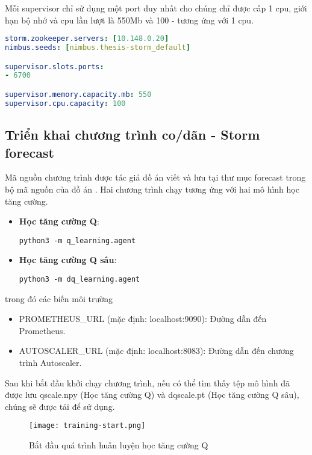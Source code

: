 Mỗi supervisor chỉ sử dụng một port duy nhất cho chúng chỉ được cấp 1 \gls{cpu}, giới hạn bộ nhớ và \gls{cpu} lần lượt là 550Mb và 100 - tương ứng với 1 \gls{cpu}.
\begin{lstlisting}[language=yaml, caption={Cấu hình của dịch vụ supervisor}]
storm.zookeeper.servers: [10.148.0.20]
nimbus.seeds: [nimbus.thesis-storm_default]

supervisor.slots.ports:
- 6700

supervisor.memory.capacity.mb: 550
supervisor.cpu.capacity: 100
\end{lstlisting}

\subsection{Triển khai chương trình co/dãn - Storm forecast}

Mã nguồn chương trình được tác giả đồ án viết và lưu tại thư mục forecast trong bộ mã nguồn của đồ án \autocite{lemionday_thesis_storm}. Hai chương trình chạy tương ứng với hai mô hình học tăng cường.

\begin{itemize}
    \item \textbf{Học tăng cường Q}:
          \begin{verbatim}
python3 -m q_learning.agent
    \end{verbatim}
    \item \textbf{Học tăng cường Q sâu}:
          \begin{verbatim}
python3 -m dq_learning.agent
    \end{verbatim}
\end{itemize}

trong đó các biến môi trường
\begin{itemize}
    \item PROMETHEUS\_URL (mặc định: localhost:9090): Đường dẫn đến Prometheus.
    \item AUTOSCALER\_URL (mặc định: localhost:8083): Đường dẫn đến chương trình Autoscaler.
\end{itemize}

Sau khi bắt đầu khởi chạy chương trình, nếu có thể tìm thấy tệp mô hình đã được lưu qscale.npy (Học tăng cường Q) và dqscale.pt (Học tăng cường Q sâu), chúng sẽ được tải để sử dụng.

\begin{figure}[H]
    \centering
    \texttt{[image: training-start.png]}
    \caption{Bắt đầu quá trình huấn luyện học tăng cường Q}
    \label{fig:training-start}
\end{figure}

